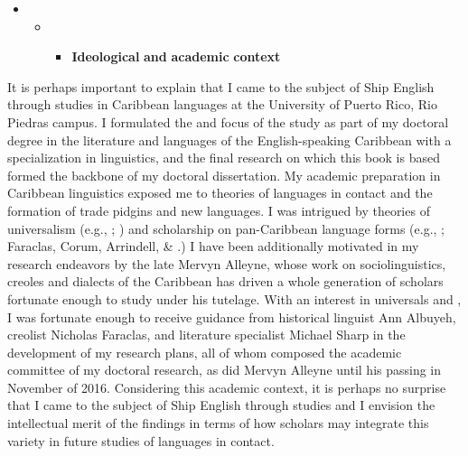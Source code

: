 \begin{itemize}
\item 
\begin{itemize}
\item 
\begin{itemize}
\item \textbf{Ideological} \textbf{and} \textbf{academic} \textbf{context}
\end{itemize}
\end{itemize}
\end{itemize}

It is perhaps important to explain that I came to the subject of Ship English through studies in Caribbean languages at the University of Puerto Rico, Rio Piedras campus. I formulated the  and focus of the study as part of my doctoral degree in the literature and languages of the English-speaking Caribbean with a specialization in linguistics, and the final research on which this book is based formed the backbone of my doctoral dissertation. My academic preparation in Caribbean linguistics exposed me to theories of languages in contact and the formation of trade pidgins and new  languages. I was intrigued by theories of universalism (e.g., \citealt{MuyskenSmith1986}; \citealt{McWhorter2011}) and scholarship on pan-Caribbean language forms (e.g., \citealt{Allsopp2003}; Faraclas, Corum, Arrindell, \& \citealt{Ourdy2012}.) I have been additionally motivated in my research endeavors by the late Mervyn Alleyne, whose work on sociolinguistics, creoles and dialects of the Caribbean has driven a whole generation of scholars fortunate enough to study under his tutelage. With an interest in  universals and , I was fortunate enough to receive guidance from historical linguist Ann Albuyeh, creolist Nicholas Faraclas, and literature specialist Michael Sharp in the development of my research plans, all of whom composed the academic committee of my doctoral research, as did Mervyn Alleyne until his passing in November of 2016. Considering this academic context, it is perhaps no surprise that I came to the subject of Ship English through  studies and I envision the intellectual merit of the findings in terms of how scholars may integrate this variety in future studies of languages in contact.



